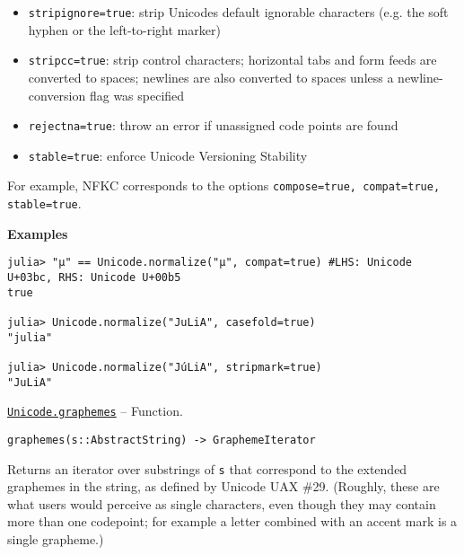 \begin{adjustwidth}{2em}{0pt}
\begin{itemize}
\item \texttt{stripignore=true}: strip Unicode{\textquotesingle}s {\textquotedbl}default ignorable{\textquotedbl} characters (e.g. the soft hyphen or the left-to-right marker)


\item \texttt{stripcc=true}: strip control characters; horizontal tabs and form feeds are converted to spaces; newlines are also converted to spaces unless a newline-conversion flag was specified


\item \texttt{rejectna=true}: throw an error if unassigned code points are found


\item \texttt{stable=true}: enforce Unicode Versioning Stability

\end{itemize}
For example, NFKC corresponds to the options \texttt{compose=true, compat=true, stable=true}.

\textbf{Examples}


\begin{verbatim}
julia> "μ" == Unicode.normalize("µ", compat=true) #LHS: Unicode U+03bc, RHS: Unicode U+00b5
true

julia> Unicode.normalize("JuLiA", casefold=true)
"julia"

julia> Unicode.normalize("JúLiA", stripmark=true)
"JuLiA"
\end{verbatim}



\end{adjustwidth}
\hypertarget{15282403158595139101}{} 
\hyperlink{15282403158595139101}{\texttt{Unicode.graphemes}}  -- {Function.}

\begin{adjustwidth}{2em}{0pt}


\begin{verbatim}
graphemes(s::AbstractString) -> GraphemeIterator
\end{verbatim}

Returns an iterator over substrings of \texttt{s} that correspond to the extended graphemes in the string, as defined by Unicode UAX \#29. (Roughly, these are what users would perceive as single characters, even though they may contain more than one codepoint; for example a letter combined with an accent mark is a single grapheme.)

\end{adjustwidth}






